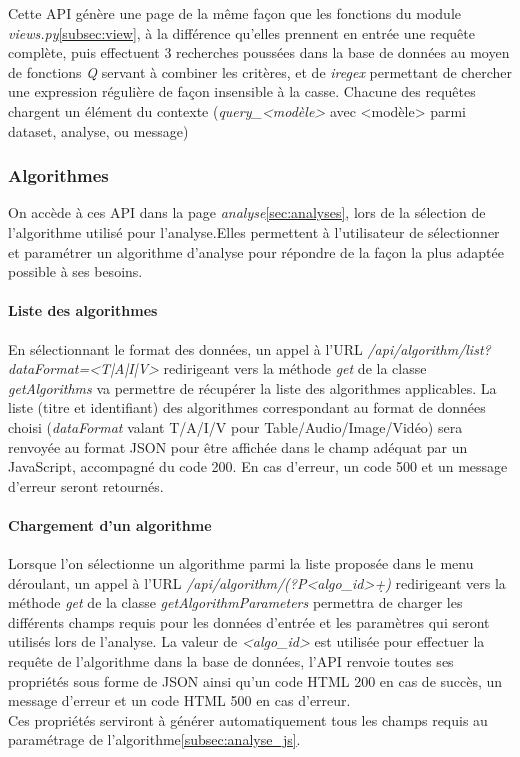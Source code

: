 \documentclass[a4paper]{report}
\begin{document}
Cette API génère une page de la même façon que les fonctions du module \emph{views.py}\ref{subsec:view}, à la différence qu'elles prennent en entrée une requête complète, puis effectuent 3 recherches poussées dans la base de données au moyen de fonctions \emph{Q} servant à combiner les critères, et de \emph{iregex} permettant de chercher une expression régulière de façon insensible à la casse. Chacune des requêtes chargent un élément du contexte (\emph{query\_<modèle>} avec <modèle> parmi dataset, analyse, ou message)

\subsubsection{Algorithmes}
On accède à ces API dans la page \emph{analyse}\ref{sec:analyses}, lors de la sélection de l'algorithme utilisé pour l'analyse.Elles permettent à l'utilisateur de sélectionner et paramétrer un algorithme d'analyse pour répondre de la façon la plus adaptée possible à ses besoins.

\paragraph{Liste des algorithmes}
En sélectionnant le format des données, un appel à l'URL \emph{/api/algorithm/list?dataFormat=<T|A|I|V>} redirigeant vers la méthode \emph{get} de la classe \emph{getAlgorithms} va permettre de récupérer la liste des algorithmes applicables.
La liste (titre et identifiant) des algorithmes correspondant au format de données choisi (\emph{dataFormat} valant T/A/I/V pour Table/Audio/Image/Vidéo) sera renvoyée au format JSON pour être affichée dans le champ adéquat par un JavaScript, accompagné du code 200. En cas d'erreur, un code 500 et un message d'erreur seront retournés.

\paragraph{Chargement d'un algorithme} Lorsque l'on sélectionne un algorithme parmi la liste proposée dans le menu déroulant, un appel à l'URL \emph{/api/algorithm/(?P<algo\_id>\d+)} redirigeant vers la méthode \emph{get} de la classe \emph{getAlgorithmParameters} permettra de charger les différents champs requis pour les données d'entrée et les paramètres qui seront utilisés lors de l'analyse. La valeur de \emph{<algo\_id>} est utilisée pour effectuer la requête de l'algorithme dans la base de données, l'API renvoie toutes ses propriétés sous forme de JSON ainsi qu'un code HTML 200 en cas de succès, un message d'erreur et un code HTML 500 en cas d'erreur.\\
Ces propriétés serviront à générer automatiquement tous les champs requis au paramétrage de l'algorithme\ref{subsec:analyse_js}.
\end{document}
